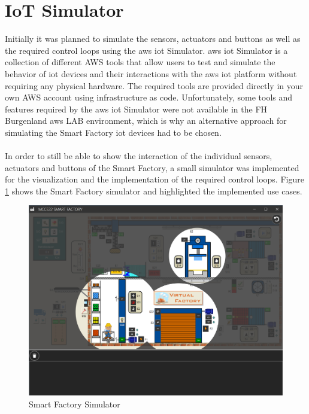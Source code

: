 \section{IoT Simulator}
Initially it was planned to simulate the sensors, actuators and buttons as well as the required control loops using the \ac{aws} \ac{iot} Simulator. 
\ac{aws} \ac{iot} Simulator is a collection of different AWS tools that allow users to test and simulate the behavior of \ac{iot} devices and their interactions with the \ac{aws} \ac{iot} platform without requiring any physical hardware. 
The required tools are provided directly in your own AWS account using infrastructure as code.
Unfortunately, some tools and features required by the \ac{aws} \ac{iot} Simulator were not available in the FH Burgenland \ac{aws} LAB environment, which is why an alternative approach for simulating the Smart Factory \ac{iot} devices had to be chosen.
\\
\\
In order to still be able to show the interaction of the individual sensors, actuators and buttons of the Smart Factory, a small simulator was implemented for the visualization and the implementation of the required control loops. 
Figure \ref{fig:SmartFactorySimulator} shows the Smart Factory simulator and highlighted the implemented use cases.

\begin{figure}[H]
	\centering
	\includegraphics[width=15cm]{images/smart_factory_simulator.png}
	\caption{Smart Factory Simulator}    
	\label{fig:SmartFactorySimulator}
\end{figure}

